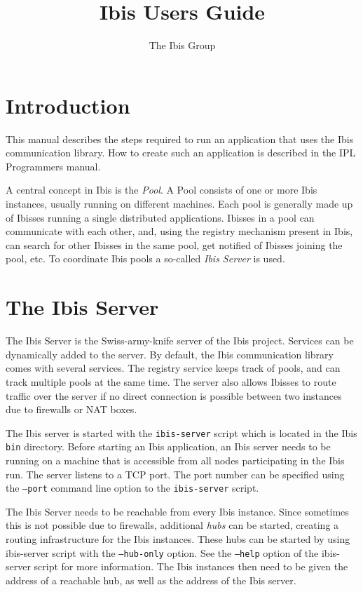 \documentclass[10pt]{article}
\begin{document}
\title{Ibis Users Guide}

\author{The Ibis Group}

\maketitle

\section{Introduction}

This manual describes the steps required to run an application that uses
 the Ibis communication library. How to create such an application
is described in the IPL Programmers manual.

A central concept in Ibis is the \emph{Pool}. A Pool consists of one or
more Ibis instances, usually running on different machines. Each pool is
generally made up of Ibisses running a single distributed applications.
Ibisses in a pool can communicate with each other, and, using the
registry mechanism present in Ibis, can search for other Ibisses in the
same pool, get notified of Ibisses joining the pool, etc. To
coordinate Ibis pools a so-called \emph{Ibis Server} is used.

\section{The Ibis Server}

The Ibis Server is the Swiss-army-knife server of the Ibis project.
Services can be dynamically added to the server. By default, the Ibis
communication library comes with several services. The registry service
keeps track of pools, and can track multiple pools at the same time.
The server also allows Ibisses to route traffic over the server if no
direct connection is possible between two instances due to firewalls or
NAT boxes.

The Ibis server is started with the \texttt{ibis-server} script which is
located in the Ibis \texttt{bin} directory.  Before starting an Ibis
application, an Ibis server needs to be running on a machine that is
accessible from all nodes participating in the Ibis run. The server
listens to a TCP port. The port number can be specified using the
\texttt{--port} command line option to the \texttt{ibis-server} script.

The Ibis Server needs to be reachable from every Ibis
instance. Since sometimes this is not possible due to firewalls,
additional \emph{hubs} can be started, creating a routing infrastructure
for the Ibis instances. These hubs can be started by using ibis-server
script with the \texttt{--hub-only} option. See the \texttt{--help}
option of the ibis-server script for more information. The Ibis
instances then need to be given the address of a reachable hub, as well
as the address of the Ibis server.
\end{document}
